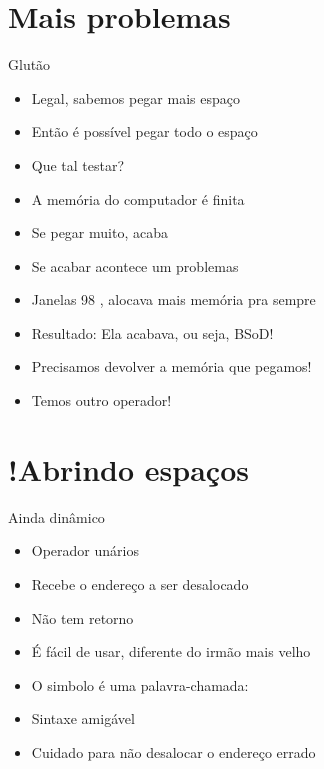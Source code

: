 \documentclass[14pt]{beamer}
\begin{document}
	\section{Mais problemas}
		\begin{frame}{Glutão}
			\begin{itemize}
				\presentationPause\item Legal, sabemos pegar mais espaço
				\presentationPause\item Então é possível pegar todo o espaço
				\presentationPause\item Que tal testar?
				\presentationPause\item A memória do computador é finita
				\presentationPause\item Se pegar muito, acaba
				\presentationPause\item Se acabar acontece um problemas
				\presentationPause\item Janelas 98 \textregistered\presentationPause, alocava mais memória pra sempre
				\presentationPause\item Resultado: \presentationPause Ela acabava\presentationPause, ou seja, BSoD!
				\presentationPause\item Precisamos devolver a memória que pegamos!
				\presentationPause\item Temos outro operador!
			\end{itemize}
		\end{frame}

	\section{!Abrindo espaços}
		\begin{frame}{Ainda dinâmico}
			\begin{itemize}
				\presentationPause\item Operador unários
				\presentationPause\item Recebe o endereço a ser desalocado
				\presentationPause\item Não tem retorno
				\presentationPause\item É fácil de usar\presentationPause, diferente do irmão mais velho
				\presentationPause\item O simbolo é uma palavra-chamada: \presentationPause{}
				\presentationPause\item Sintaxe amigável
			\end{itemize}
			\presentationPause
			\presentationPause
			\begin{itemize}
				\presentationPause\item Cuidado para não desalocar o endereço errado
			\end{itemize}
		\end{frame}
\end{document}
